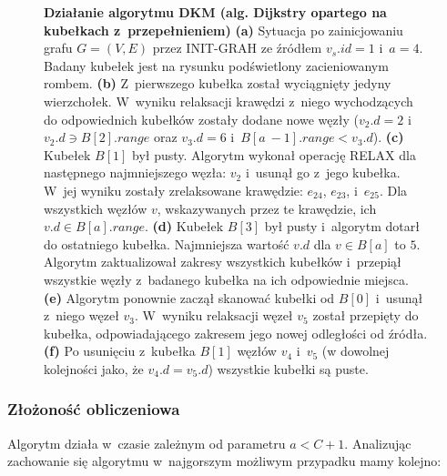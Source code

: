 \begin{figure}[!htbp]
\begin{subfigure}[b]{0.32\textwidth}
		\caption{}
	\end{subfigure}
	\caption{\textbf{Działanie algorytmu DKM (alg. Dijkstry opartego na kubełkach z~przepełnieniem)} \textbf{(a)}  Sytuacja po zainicjowaniu grafu $G = \left( V, E \right)$ przez \textsf{INIT-GRAH} ze źródłem $v_{s}.id = 1$ i~$a = 4$. Badany kubełek jest na rysunku podświetlony zacieniowanym rombem. \textbf{(b)} Z~pierwszego kubełka został wyciągnięty jedyny wierzchołek. W~wyniku relaksacji krawędzi z~niego wychodzących do odpowiednich kubełków zostały dodane nowe węzły ($v_{2}.d = 2$ i~$ v_{2}.d \ni B \left[ 2 \right].range$ oraz $v_{3}.d = 6$ i~$ B \left[ a~- 1 \right].range < v_{3}.d $). \textbf{(c)} Kubełek $B \left[ 1 \right]$ był pusty. Algorytm wykonał operację \textsf{RELAX} dla następnego najmniejszego węzła: $v_{2}$ i~usunął go z~jego kubełka. W~jej wyniku zostały zrelaksowane krawędzie: $e_{24}$, $e_{23}$, i~$e_{25}$. Dla wszystkich węzłów $v$, wskazywanych przez te krawędzie, ich $v.d \in B \left[ a \right].range$. \textbf{(d)} Kubełek $B \left[ 3 \right]$ był pusty i~algorytm dotarł do ostatniego kubełka. Najmniejsza wartość $v.d$ dla $v \in B \left[ a \right]$ to $5$. Algorytm zaktualizował zakresy wszystkich kubełków i~przepiął wszystkie węzły z~badanego kubełka na ich odpowiednie miejsca. \textbf{(e)} Algorytm ponownie zaczął skanować kubełki od $B \left[ 0 \right]$ i~usunął z~niego węzeł $v_{3}$. W~wyniku relaksacji węzeł $v_{5}$ został przepięty do kubełka, odpowiadającego zakresem jego nowej odległości od źródła. \textbf{(f)} Po usunięciu z~kubełka $B \left[ 1 \right]$ węzłów $v_{4}$ i~$v_{5}$ (w dowolnej kolejności jako, że $v_{4}.d = v_{5}.d$) wszystkie kubełki są puste. } \label{fig:exampleOverflowBucket}
\end{figure}

\subsubsection{Złożoność obliczeniowa}

Algorytm działa w~czasie zależnym od parametru $a < C + 1$. Analizując zachowanie się algorytmu w~najgorszym możliwym przypadku mamy kolejno:

